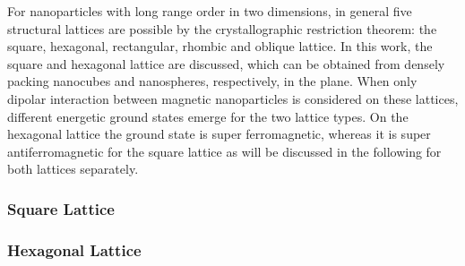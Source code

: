 \documentclass[\main/dresen_thesis.tex]{subfiles}
\begin{document}
  For nanoparticles with long range order in two dimensions, in general five structural lattices are possible by the crystallographic restriction theorem: the square, hexagonal, rectangular, rhombic and oblique lattice.
  In this work, the square and hexagonal lattice are discussed, which can be obtained from densely packing nanocubes and nanospheres, respectively, in the plane.
  When only dipolar interaction between magnetic nanoparticles is considered on these lattices, different energetic ground states emerge for the two lattice types.
  On the hexagonal lattice the ground state is super ferromagnetic, whereas it is super antiferromagnetic for the square lattice as will be discussed in the following for both lattices separately.


  \subsubsection{Square Lattice}
    

  \subsubsection{Hexagonal Lattice}
\end{document}
